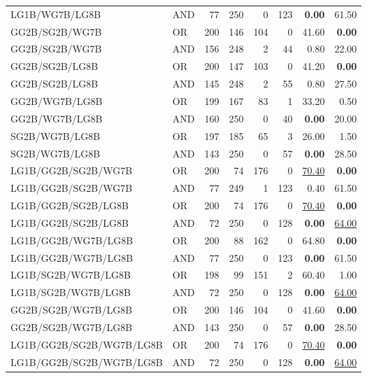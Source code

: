 \documentclass{article}
\begin{document}
{\begin{longtable}{llrrrrrr}
 LG1B/WG7B/LG8B           & AND     &   77 &  250 &    0 &  123 & \textbf{0.00}     & 61.50             \\
 GG2B/SG2B/WG7B           & OR      &  200 &  146 &  104 &    0 & 41.60             & \textbf{0.00}     \\
 GG2B/SG2B/WG7B           & AND     &  156 &  248 &    2 &   44 & 0.80              & 22.00             \\
 GG2B/SG2B/LG8B           & OR      &  200 &  147 &  103 &    0 & 41.20             & \textbf{0.00}     \\
 GG2B/SG2B/LG8B           & AND     &  145 &  248 &    2 &   55 & 0.80              & 27.50             \\
 GG2B/WG7B/LG8B           & OR      &  199 &  167 &   83 &    1 & 33.20             & 0.50              \\
 GG2B/WG7B/LG8B           & AND     &  160 &  250 &    0 &   40 & \textbf{0.00}     & 20.00             \\
 SG2B/WG7B/LG8B           & OR      &  197 &  185 &   65 &    3 & 26.00             & 1.50              \\
 SG2B/WG7B/LG8B           & AND     &  143 &  250 &    0 &   57 & \textbf{0.00}     & 28.50             \\
 LG1B/GG2B/SG2B/WG7B      & OR      &  200 &   74 &  176 &    0 & \underline{70.40} & \textbf{0.00}     \\
 LG1B/GG2B/SG2B/WG7B      & AND     &   77 &  249 &    1 &  123 & 0.40              & 61.50             \\
 LG1B/GG2B/SG2B/LG8B      & OR      &  200 &   74 &  176 &    0 & \underline{70.40} & \textbf{0.00}     \\
 LG1B/GG2B/SG2B/LG8B      & AND     &   72 &  250 &    0 &  128 & \textbf{0.00}     & \underline{64.00} \\
 LG1B/GG2B/WG7B/LG8B      & OR      &  200 &   88 &  162 &    0 & 64.80             & \textbf{0.00}     \\
 LG1B/GG2B/WG7B/LG8B      & AND     &   77 &  250 &    0 &  123 & \textbf{0.00}     & 61.50             \\
 LG1B/SG2B/WG7B/LG8B      & OR      &  198 &   99 &  151 &    2 & 60.40             & 1.00              \\
 LG1B/SG2B/WG7B/LG8B      & AND     &   72 &  250 &    0 &  128 & \textbf{0.00}     & \underline{64.00} \\
 GG2B/SG2B/WG7B/LG8B      & OR      &  200 &  146 &  104 &    0 & 41.60             & \textbf{0.00}     \\
 GG2B/SG2B/WG7B/LG8B      & AND     &  143 &  250 &    0 &   57 & \textbf{0.00}     & 28.50             \\
 LG1B/GG2B/SG2B/WG7B/LG8B & OR      &  200 &   74 &  176 &    0 & \underline{70.40} & \textbf{0.00}     \\
 LG1B/GG2B/SG2B/WG7B/LG8B & AND     &   72 &  250 &    0 &  128 & \textbf{0.00}     & \underline{64.00} \\

\end{longtable}
}
\end{document}
